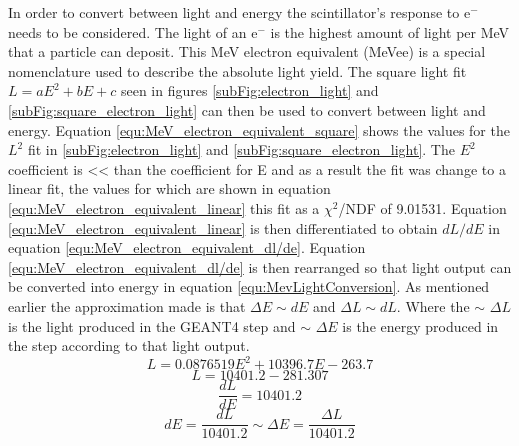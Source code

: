 In order to convert between light and energy the scintillator's response to e$^-$ needs to be considered. The light of an e$^-$ is the highest amount of light per MeV that a particle can deposit. This MeV electron equivalent (MeVee) is a special nomenclature used to describe the absolute light yield. The square light fit $L = aE^2 + bE +c$ seen in figures \ref{subFig:electron_light} and \ref{subFig:square_electron_light} can then be used to convert between light and energy. Equation \ref{equ:MeV_electron_equivalent_square} shows the values for the $L^2$ fit in \ref{subFig:electron_light} and \ref{subFig:square_electron_light}. The $E^2$ coefficient is << than the coefficient for E and as a result the fit was change to a linear fit, the values for which are shown in equation \ref{equ:MeV_electron_equivalent_linear} this fit as a $\chi^2$/NDF of 9.01531. Equation \ref{equ:MeV_electron_equivalent_linear} is then differentiated to obtain $dL/dE$ in equation \ref{equ:MeV_electron_equivalent_dl/de}. Equation \ref{equ:MeV_electron_equivalent_dl/de} is then rearranged so that light output can be converted into energy in equation \ref{equ:MevLightConversion}. As mentioned earlier the approximation made is that $\Delta E \sim dE$ and $\Delta L \sim dL$. Where the $\sim$ $\Delta L$ is the light produced in the GEANT4 step and $\sim$ $\Delta E$ is the energy produced in the step according to that light output.
\begin{equation}
L = 0.0876519E^2 + 10396.7E - 263.7
\label{equ:MeV_electron_equivalent_square}
\end{equation}
\begin{equation}
L = 10401.2 - 281.307
\label{equ:MeV_electron_equivalent_linear}
\end{equation}
\begin{equation}
\frac{dL}{dE} = 10401.2
\label{equ:MeV_electron_equivalent_dl/de}
\end{equation}
\begin{equation}
dE = \frac{dL}{10401.2} \sim \Delta E = \frac{\Delta L}{10401.2}
\label{equ:MevLightConversion}
\end{equation}

